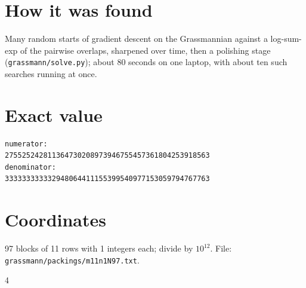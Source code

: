 \documentclass[11pt,a4paper]{article}
\begin{document}
\section{How it was found}
Many random starts of gradient descent on the Grassmannian against a log-sum-exp of the pairwise overlaps, sharpened over time, then a polishing stage (\texttt{grassmann/solve.py}); about 80 seconds on one laptop, with about ten such searches running at once.


\appendix
\section{Exact value}
{\small
\begin{verbatim}
numerator:
275525242811364730208973946755457361804253918563
denominator:
333333333332948064411155399540977153059794767763
\end{verbatim}}

\section{Coordinates}
97 blocks of 11 rows with 1 integers each; divide by $10^{12}$. File: \texttt{grassmann/packings/m11n1N97.txt}.
{\tiny
\begin{multicols}{4}
\end{multicols}}
\end{document}
